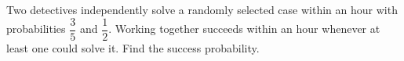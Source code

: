 Two detectives independently solve a randomly selected case within an hour with probabilities $\dfrac{3}{5}$ and $\dfrac{1}{2}$. Working together succeeds within an hour whenever at least one could solve it. Find the success probability.
